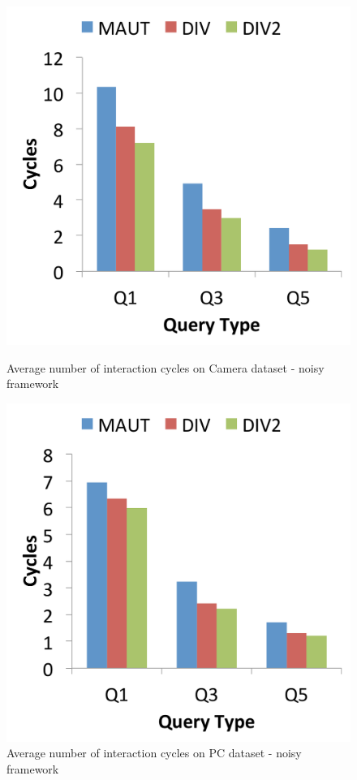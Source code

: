 \begin{figure}[h]
\centering
\begin{minipage}{.45\textwidth}
  \centering
  \includegraphics[width=1\linewidth]{figures-bharath/div_camera_noisy}
  \caption[]{Average number of interaction cycles on Camera dataset - noisy framework}
  \label{fig:div_camera_noisy}
\end{minipage}%
\;\;\;\;\;\;
\begin{minipage}{.45\textwidth}
  \centering
  \includegraphics[width=1\linewidth]{figures-bharath/div_pc_noisy}
  \caption[]{Average number of interaction cycles on PC dataset - noisy framework}
  \label{fig:div_pc_noisy}
\end{minipage}
\end{figure}

